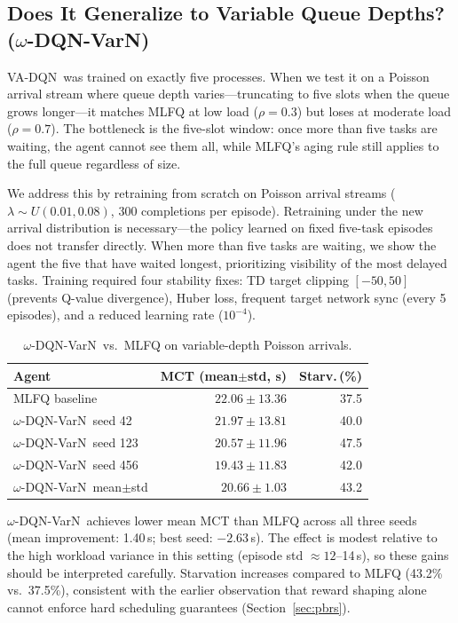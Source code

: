 \documentclass[10pt,twocolumn]{article}
\theoremstyle{remark}
\newcommand{\vadqn}{VA-DQN}
\newcommand{\omegavarn}{$\omega$-DQN-VarN}
\begin{document}
\subsection{Does It Generalize to Variable Queue Depths? (\omegavarn)}

\vadqn\ was trained on exactly five processes. When we test it on a
Poisson arrival stream where queue depth varies---truncating to five
slots when the queue grows longer---it matches MLFQ at low load
($\rho=0.3$) but loses at moderate load ($\rho=0.7$). The bottleneck
is the five-slot window: once more than five tasks are waiting, the
agent cannot see them all, while MLFQ's aging rule still applies to
the full queue regardless of size.

We address this by retraining from scratch on Poisson arrival streams
($\lambda\sim U(0.01,0.08)$, 300 completions per episode). Retraining
under the new arrival distribution is necessary---the policy learned
on fixed five-task episodes does not transfer directly. When more
than five tasks are waiting, we show the agent the five that have
waited longest, prioritizing visibility of the most delayed tasks.
Training required four stability fixes: TD target clipping $[-50,50]$
(prevents Q-value divergence), Huber loss, frequent target network
sync (every 5 episodes), and a reduced learning rate ($10^{-4}$).

\begin{table}[h]
\centering
\caption{\omegavarn\ vs.\ MLFQ on variable-depth Poisson arrivals.}
\label{tab:w15}
\small
\begin{tabular}{lrr}
\toprule
Agent & MCT (mean$\pm$std, s) & Starv.\,(\%) \\
\midrule
MLFQ baseline & $22.06\pm13.36$ & 37.5 \\
\omegavarn\ seed 42 & $21.97\pm13.81$ & 40.0 \\
\omegavarn\ seed 123 & $20.57\pm11.96$ & 47.5 \\
\omegavarn\ seed 456 & $\mathbf{19.43\pm11.83}$ & 42.0 \\
\omegavarn\ mean$\pm$std & $20.66\pm1.03$ & 43.2 \\
\bottomrule
\end{tabular}
\end{table}

\omegavarn\ achieves lower mean MCT than MLFQ across all three seeds
(mean improvement: 1.40\,s; best seed: $-2.63$\,s). The effect is
modest relative to the high workload variance in this setting
(episode std $\approx12$--14\,s), so these gains should be
interpreted carefully. Starvation increases compared to MLFQ (43.2\%
vs.\ 37.5\%), consistent with the earlier observation that reward
shaping alone cannot enforce hard scheduling guarantees
(Section~\ref{sec:pbrs}).
\end{document}
